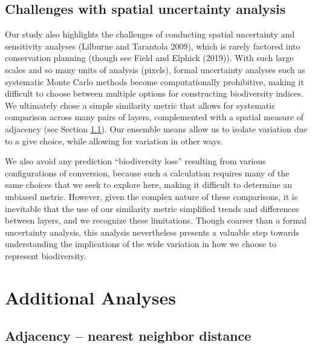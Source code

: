 \documentclass[
]{article}
\begin{document}
\hypertarget{challenges-with-spatial-uncertainty-analysis}{%
\subsection{Challenges with spatial uncertainty analysis}\label{challenges-with-spatial-uncertainty-analysis}}

Our study also highlights the challenges of conducting spatial uncertainty and sensitivity analyses (Lilburne and Tarantola 2009), which is rarely factored into conservation planning (though see Field and Elphick (2019)). With such large scales and so many units of analysis (pixels), formal uncertainty analyses such as systematic Monte Carlo methods become computationally prohibitive, making it difficult to choose between multiple options for constructing biodiversity indices. We ultimately chose a simple similarity metric that allows for systematic comparison across many pairs of layers, complemented with a spatial measure of adjacency (see Section \ref{section-adjacency}). Our ensemble means allow us to isolate variation due to a give choice, while allowing for variation in other ways.

We also avoid any prediction ``biodiversity loss'' resulting from various configurations of conversion, because such a calculation requires many of the same choices that we seek to explore here, making it difficult to determine an unbiased metric. However, given the complex nature of these comparisons, it is inevitable that the use of our similarity metric simplified trends and differences between layers, and we recognize these limitations. Though coarser than a formal uncertainty analysis, this analysis nevertheless presents a valuable step towards understanding the implications of the wide variation in how we choose to represent biodiversity.

\hypertarget{robust}{%
\section{Additional Analyses}\label{robust}}

\hypertarget{section-adjacency}{%
\subsection{Adjacency -- nearest neighbor distance}\label{section-adjacency}}
\end{document}
